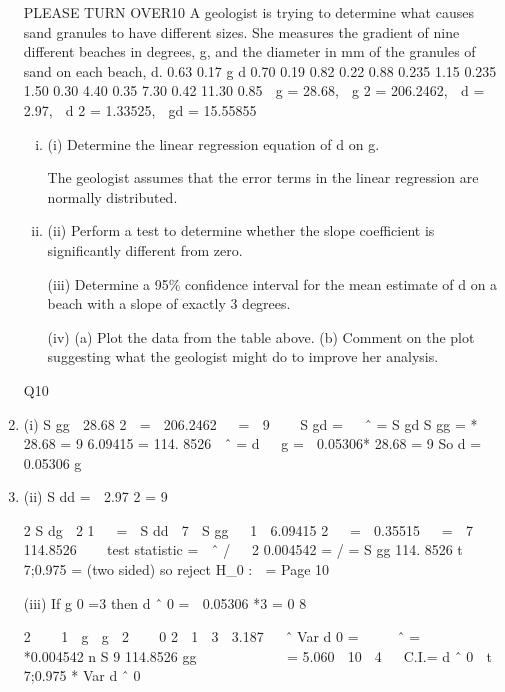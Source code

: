 \documentclass[a4paper,12pt]{article}
\begin{document}
\begin{enumerate}
PLEASE TURN OVER10
A geologist is trying to determine what causes sand granules to have different sizes.
She measures the gradient of nine different beaches in degrees, g, and the diameter in mm of the granules of sand on each beach, d.
0.63
0.17
g
d
0.70
0.19
0.82
0.22
0.88
0.235
1.15
0.235
1.50
0.30
4.40
0.35
7.30
0.42
11.30
0.85
 g = 28.68,  g 2 = 206.2462,  d = 2.97,  d 2 = 1.33525,  gd = 15.55855
\begin{enumerate}[(i)]
\item (i)
Determine the linear regression equation of d on g.

The geologist assumes that the error terms in the linear regression are normally distributed.
\item (ii)
Perform a test to determine whether the slope coefficient is significantly different from zero.

(iii) Determine a 95\% confidence interval for the mean estimate of d on a beach with a slope of exactly 3 degrees.

(iv) (a)
Plot the data from the table above.
(b)
Comment on the plot suggesting what the geologist might do to
improve her analysis.

\end{enumerate}

Q10
\item (i)
S gg

28.68 2 
\;=\;  206.2462 
 \;=

9  

S gd \;= 
 ˆ \;=\;
S gd
S gg
\;= * 28.68
\;=
9
6.09415
\;=
114. 8526
 ˆ \;=\; d   g \;=  0.05306* 28.68
\;=
9
So d \;=  0.05306 g
\item (ii)
S dd \;= 
2.97 2
\;=
9





2
S dg
 2 1 
 \;=\;  S dd 
7 
S gg
  1 
6.09415 2 
 \;=\;  0.35515 
 \;=
 7  
114.8526  
 
test statistic \;=\;  ˆ / 
 2
0.004542
\;= /
\;=
S gg
114. 8526 
t 7;0.975 \;= (two sided) so reject H_0 :  \;=
Page 10

(iii)
If g 0 =3 then d ˆ 0 \;=  0.05306 *3 \;= 0 8

2 
  1  g  g  2  

0
2  1  3  3.187  
ˆ
Var d 0 \;=\;  
  ˆ \;=\;  
 *0.004542
n
S
9
114.8526
gg
 
 
 
 
 
= 5.060  10  4
 
C.I.= d ˆ 0  t 7;0.975 * Var d ˆ 0


\end{enumerate}
\end{document}
